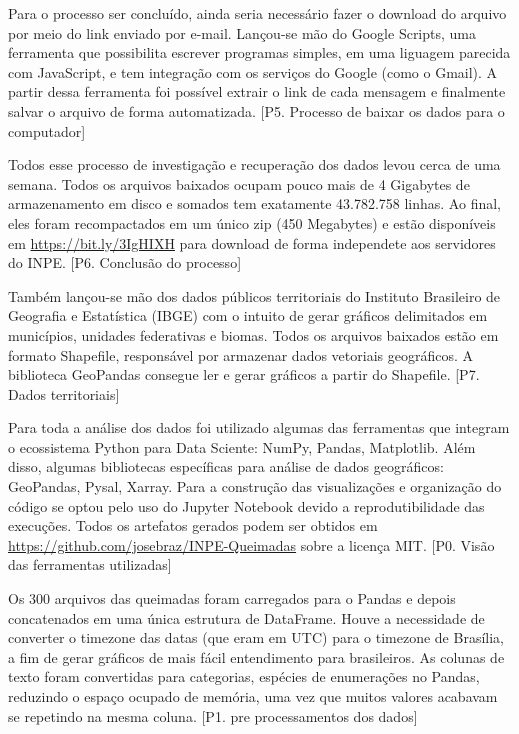 \documentclass[cic,tc]{iiufrgs}
\begin{document}
Para o processo ser concluído, ainda seria 
necessário fazer o download do arquivo por meio do link enviado por e-mail.
Lançou-se mão do Google Scripts, uma ferramenta que possibilita escrever 
programas simples, em uma liguagem parecida com JavaScript, e tem 
integração com os serviços do Google (como o Gmail). A partir dessa ferramenta
foi possível extrair o link de cada mensagem e finalmente salvar o arquivo
de forma automatizada. [P5. Processo de baixar os dados para o computador] \par

Todos esse processo de investigação e recuperação dos dados levou cerca de uma 
semana. Todos os arquivos baixados ocupam pouco mais de 4 Gigabytes de 
armazenamento em disco e somados tem exatamente 43.782.758 linhas. Ao final, eles 
foram recompactados em um único zip (450 Megabytes) e estão disponíveis 
em \url{https://bit.ly/3IgHIXH} para download de forma independete aos servidores 
do INPE. [P6. Conclusão do processo] \par

Também lançou-se mão dos dados públicos territoriais do Instituto Brasileiro de 
Geografia e Estatística (IBGE) com o intuito de gerar gráficos delimitados em 
municípios, unidades federativas e biomas. Todos os arquivos baixados estão em 
formato Shapefile, responsável por armazenar dados vetoriais geográficos. A 
biblioteca GeoPandas consegue ler e gerar gráficos a partir do Shapefile.
[P7. Dados territoriais] \par


Para toda a análise dos dados foi utilizado algumas das ferramentas que integram o 
ecossistema Python para Data Sciente: NumPy, Pandas, Matplotlib. Além disso, 
algumas bibliotecas específicas para análise de dados geográficos: GeoPandas, 
Pysal, Xarray. Para a construção das visualizações e organização do código se 
optou pelo uso do Jupyter Notebook devido a reprodutibilidade das execuções. 
Todos os artefatos gerados podem ser obtidos em 
\url{https://github.com/josebraz/INPE-Queimadas} sobre a licença MIT. 
[P0. Visão das ferramentas utilizadas]\par

Os 300 arquivos das queimadas foram carregados para o Pandas e depois concatenados
em uma única estrutura de DataFrame. Houve a necessidade de converter o timezone 
das datas (que eram em UTC) para o timezone de Brasília, a fim de gerar gráficos 
de mais fácil entendimento para brasileiros. As colunas de texto foram convertidas 
para categorias, espécies de enumerações no Pandas, reduzindo o espaço ocupado 
de memória, uma vez que muitos valores acabavam se repetindo na mesma coluna. 
[P1. pre processamentos dos dados]\par
\end{document}
